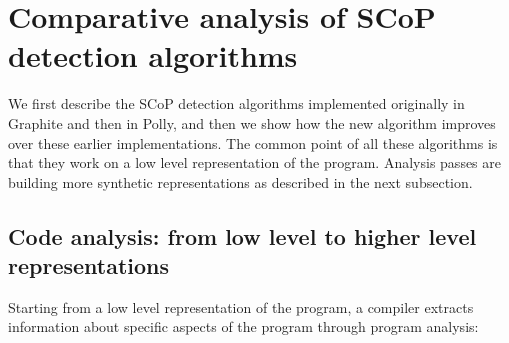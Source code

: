 \documentclass{sigplanconf}
\begin{document}
\section{Comparative analysis of SCoP detection algorithms}

We first describe the SCoP detection algorithms implemented originally in
Graphite and then in Polly, and then we show how the new algorithm improves over
these earlier implementations.  The common point of all these algorithms is that
they work on a low level representation of the program.  Analysis passes are
building more synthetic representations as described in the next subsection.

\subsection{Code analysis: from low level to higher level representations}

Starting from a low level representation of the program, a compiler extracts
information about specific aspects of the program through program analysis:
\end{document}
